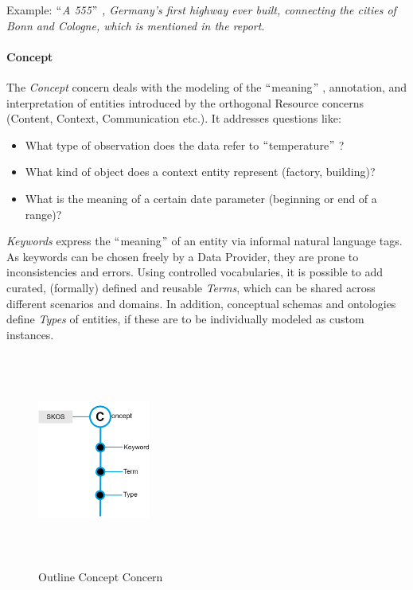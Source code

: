 Example: \textit{$``$A 555$"$ , Germany’s first highway ever built, connecting the cities of Bonn and Cologne, which is mentioned in the report}. 

\paragraph{Concept\\}
 The \textit{Concept }concern deals with the modeling of the $``$meaning$"$ , annotation, and interpretation of entities introduced by the orthogonal Resource concerns (Content, Context, Communication etc.). It addresses questions like:  \begin{itemize}
	\item What type of observation does the data refer to $``$temperature$"$  ? 
 	\item What kind of object does a context entity represent (factory, building)? 
 	\item What is the meaning of a certain date parameter (beginning or end of a range)?
\end{itemize} 
 \textit{Keywords }express the $``$meaning$"$  of an entity via informal natural language tags. As keywords can be chosen freely by a Data Provider, they are prone to inconsistencies and errors. Using controlled vocabularies, it is possible to add curated, (formally) defined and reusable \textit{Terms}, which can be shared across different scenarios and domains. In addition, conceptual schemas and ontologies define \textit{Types} of entities, if these are to be individually modeled as custom instances.  

\begin{figure}[H] 			
	\begin{Center}
		\includegraphics[width=1.46in,height=2.77in]{./media/image38.png}
		\caption{Outline Concept Concern}
		\label{fig:outline_concept_concern}
	\end{Center}
\end{figure}

